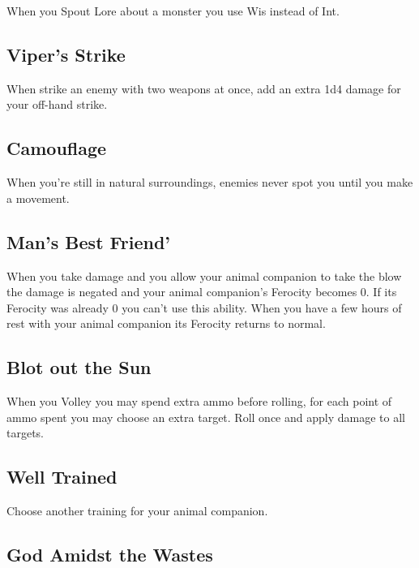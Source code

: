 When you Spout Lore about a monster you use Wis instead of Int.

 
\subsection{Viper's Strike}    
 

When strike an enemy with two weapons at once, add an extra 1d4 damage for your off-hand strike.

 
\subsection{Camouflage}   
 

When you're still in natural surroundings, enemies never spot you until you make a movement.

 
\subsection{Man's Best Friend'}    
 

When you take damage and you allow your animal companion to take the blow the damage is negated and your animal companion's Ferocity becomes 0. If its Ferocity was already 0 you can't use this ability. When you have a few hours of rest with your animal companion its Ferocity returns to normal.

 
\subsection{Blot out the Sun}    
 

When you Volley you may spend extra ammo before rolling, for each point of ammo spent you may choose an extra target. Roll once and apply damage to all targets.

 
\subsection{Well Trained}   
 

Choose another training for your animal companion.

 
\subsection{God Amidst the Wastes}    
 

